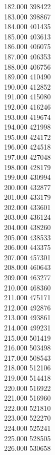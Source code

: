 { 182.000	398422 \\
 183.000	398867 \\
 184.000	401435 \\
 185.000	403613 \\
 186.000	406075 \\
 187.000	406353 \\
 188.000	406756 \\
 189.000	410490 \\
 190.000	412852 \\
 191.000	415080 \\
 192.000	416246 \\
 193.000	419674 \\
 194.000	421998 \\
 195.000	424172 \\
 196.000	424518 \\
 197.000	427048 \\
 198.000	428179 \\
 199.000	430994 \\
 200.000	432877 \\
 201.000	433179 \\
 202.000	433601 \\
 203.000	436124 \\
 204.000	438260 \\
 205.000	438533 \\
 206.000	443375 \\
 207.000	457301 \\
 208.000	460643 \\
 209.000	463277 \\
 210.000	468360 \\
 211.000	475171 \\
 212.000	492876 \\
 213.000	493861 \\
 214.000	499231 \\
 215.000	501419 \\
 216.000	503498 \\
 217.000	508543 \\
 218.000	512106 \\
 219.000	514418 \\
 220.000	516922 \\
 221.000	516960 \\
 222.000	521810 \\
 223.000	522270 \\
 224.000	525241 \\
 225.000	528505 \\
 226.000	530658 \\
}

